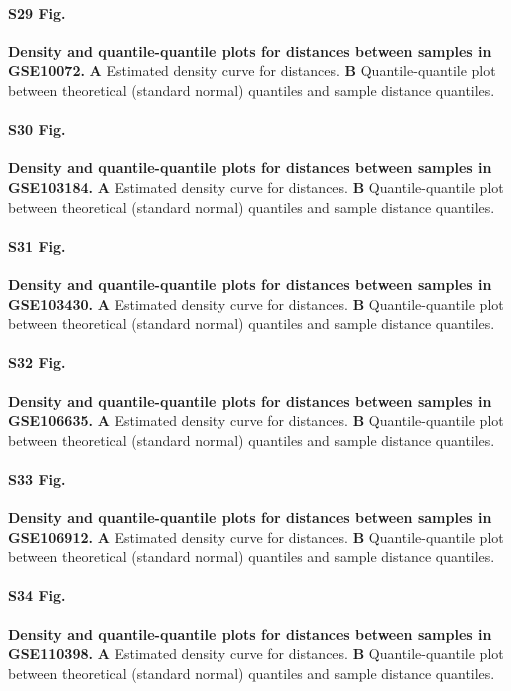 \documentclass[10pt,letterpaper]{article}
\begin{document}
\paragraph*{S29 Fig.}
\hypertarget{S29_Fig}{
{\bf Density and quantile-quantile plots for distances between samples in GSE10072.} \textbf{A} Estimated density curve for distances. \textbf{B} Quantile-quantile plot between theoretical (standard normal) quantiles and sample distance quantiles.}

\paragraph*{S30 Fig.}
\hypertarget{S30_Fig}{
{\bf Density and quantile-quantile plots for distances between samples in GSE103184.} \textbf{A} Estimated density curve for distances. \textbf{B} Quantile-quantile plot between theoretical (standard normal) quantiles and sample distance quantiles.}

\paragraph*{S31 Fig.}
\hypertarget{S31_Fig}{
{\bf Density and quantile-quantile plots for distances between samples in GSE103430.} \textbf{A} Estimated density curve for distances. \textbf{B} Quantile-quantile plot between theoretical (standard normal) quantiles and sample distance quantiles.}

\paragraph*{S32 Fig.}
\hypertarget{S32_Fig}{
{\bf Density and quantile-quantile plots for distances between samples in GSE106635.} \textbf{A} Estimated density curve for distances. \textbf{B} Quantile-quantile plot between theoretical (standard normal) quantiles and sample distance quantiles.}

\paragraph*{S33 Fig.}
\hypertarget{S33_Fig}{
{\bf Density and quantile-quantile plots for distances between samples in GSE106912.} \textbf{A} Estimated density curve for distances. \textbf{B} Quantile-quantile plot between theoretical (standard normal) quantiles and sample distance quantiles.}

\paragraph*{S34 Fig.}
\hypertarget{S34_Fig}{
{\bf Density and quantile-quantile plots for distances between samples in GSE110398.} \textbf{A} Estimated density curve for distances. \textbf{B} Quantile-quantile plot between theoretical (standard normal) quantiles and sample distance quantiles.}
\end{document}
